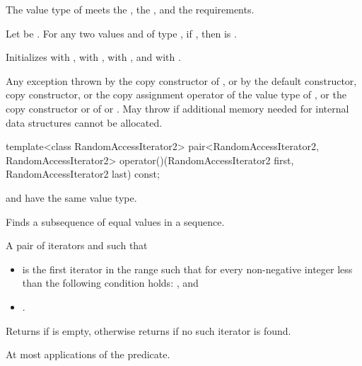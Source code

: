 \begin{itemdescr}
\pnum
\expects
The value type of  meets
the ,
the , and
the  requirements.

\pnum
Let  be .
For any two values  and  of type ,
if , then  is .

\pnum
\effects
Initializes
 with ,
 with ,
 with , and
\mbox{} with .

\pnum
\throws
Any exception thrown by the copy constructor of ,
or by the default constructor, copy constructor, or the copy assignment operator of the value type of ,
or the copy constructor or  of  or .
May throw  if additional memory needed for internal data structures cannot be allocated.
\end{itemdescr}

%
\begin{itemdecl}
template<class RandomAccessIterator2>
  pair<RandomAccessIterator2, RandomAccessIterator2>
    operator()(RandomAccessIterator2 first, RandomAccessIterator2 last) const;
\end{itemdecl}

\begin{itemdescr}
\pnum
\mandates
{} and 
have the same value type.

\pnum
\effects
Finds a subsequence of equal values in a sequence.

\pnum
\returns
A pair of iterators  and  such that
\begin{itemize}
\item {} is the first iterator
in the range  such that
for every non-negative integer  less than 
the following condition holds:
, and
\item {}.
\end{itemize}
Returns  if  is empty,
otherwise returns  if no such iterator is found.

\pnum
\complexity
At most  applications of the predicate.
\end{itemdescr}

